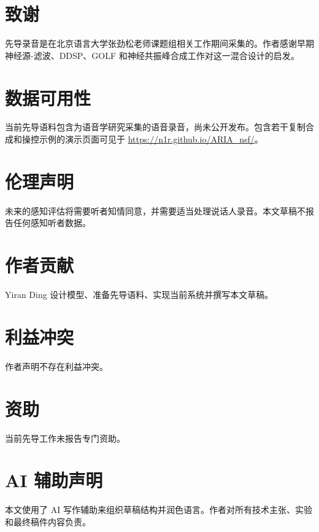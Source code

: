 \section{致谢}\label{ux81f4ux8c22}

先导录音是在北京语言大学张劲松老师课题组相关工作期间采集的。作者感谢早期神经源-滤波、DDSP、GOLF
和神经共振峰合成工作对这一混合设计的启发。

\section{数据可用性}\label{ux6570ux636eux53efux7528ux6027}

当前先导语料包含为语音学研究采集的语音录音，尚未公开发布。包含若干复制合成和操控示例的演示页面可见于
\url{https://n1r.github.io/ARIA_nsf/}。

\section{伦理声明}\label{ux4f26ux7406ux58f0ux660e}

未来的感知评估将需要听者知情同意，并需要适当处理说话人录音。本文草稿不报告任何感知听者数据。

\section{作者贡献}\label{ux4f5cux8005ux8d21ux732e}

Yiran Ding 设计模型、准备先导语料、实现当前系统并撰写本文草稿。

\section{利益冲突}\label{ux5229ux76caux51b2ux7a81}

作者声明不存在利益冲突。

\section{资助}\label{ux8d44ux52a9}

当前先导工作未报告专门资助。

\section{AI 辅助声明}\label{ai-ux8f85ux52a9ux58f0ux660e}

本文使用了 AI
写作辅助来组织草稿结构并润色语言。作者对所有技术主张、实验和最终稿件内容负责。

